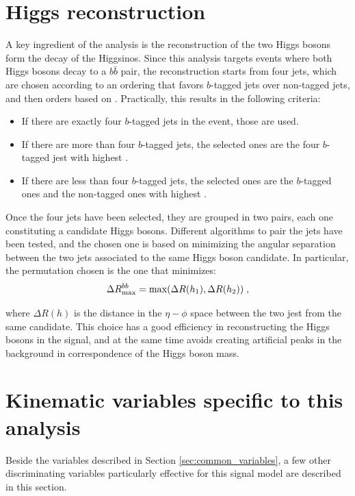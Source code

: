 \section{Higgs reconstruction}
\label{sec:ewk:higgsreco}

A key ingredient of the analysis is the reconstruction of the two Higgs bosons form the decay of the Higgsinos.
Since this analysis targets events where both Higgs bosons decay to a $b\bar{b}$ pair, the reconstruction starts 
from four jets, which are chosen according to an ordering that favors $b$-tagged jets over non-tagged jets,
and then orders based on \pt. Practically, this results in the following criteria:
\begin{itemize}
\item If there are exactly four $b$-tagged jets in the event, those are used.
\item If there are more than four $b$-tagged jets, the selected ones are the four $b$-tagged jest with highest \pt.
\item If there are less than four $b$-tagged jets, the selected ones are the $b$-tagged ones and the non-tagged ones with highest \pt.
\end{itemize} 

Once the four jets have been selected, they are grouped in two pairs, each one constituting a candidate Higgs bosons. 
Different algorithms to pair the jets have been tested, and the chosen one is based on minimizing the angular separation 
between the two jets associated to the same Higgs boson candidate. 
In particular, the permutation chosen is the one that minimizes:
\begin{equation}
\Delta R_{\mathrm{max}}^{bb} = \mathrm{max}(\Delta R(h_1), \Delta R(h_2)) \; ,
\end{equation}

\noindent where $\Delta R(h)$ is the distance in the $\eta-\phi$ space between the two jest from the same candidate.
This choice has a good efficiency in reconstructing the Higgs bosons in the signal, 
and at the same time avoids creating artificial peaks in the background in correspondence of the Higgs boson mass. 

\section{Kinematic variables specific to this analysis}

Beside the variables described in Section \ref{sec:common_variables}, a few other discriminating variables particularly 
effective for this signal model are described in this section.

